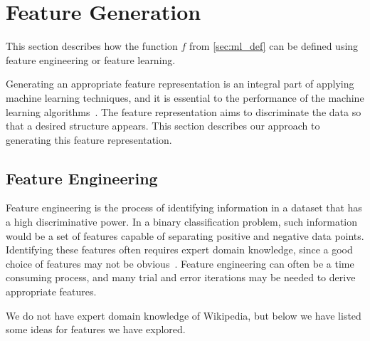 \section{Feature Generation}\label{sec:feature_generation}
This section describes how the function $f$ from \cref{sec:ml_def} can be defined using feature engineering or feature learning.

Generating an appropriate feature representation is an integral part of applying machine learning techniques, and it is essential to the performance of the machine learning algorithms~\cite{ng-lecture}. The feature representation aims to discriminate the data so that a desired structure appears. This section describes our approach to generating this feature representation.



\subsection{Feature Engineering}
Feature engineering is the process of identifying information in a dataset that has a high discriminative power. In a binary classification problem, such information would be a set of features capable of separating positive and negative data points. Identifying these features often requires expert domain knowledge, since a good choice of features may not be obvious~\cite{ng-lecture}. Feature engineering can often be a time consuming process, and many trial and error iterations may be needed to derive appropriate features.

We do not have expert domain knowledge of Wikipedia, but below we have listed some ideas for features we have explored.

